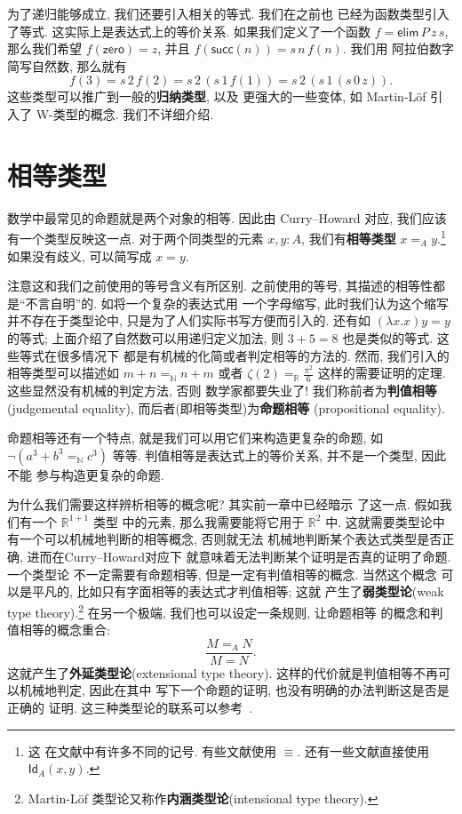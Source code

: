 \documentclass[UTF8]{ctexbook}
\newcommand{\cons}[1]{\textsf{#1}}
\theoremstyle{plain}
\theoremstyle{definition}
\theoremstyle{remark}
\begin{document}
为了递归能够成立, 我们还要引入相关的等式. 我们在之前也
已经为函数类型引入了等式. 这实际上是表达式上的等价关系.
如果我们定义了一个函数 \(f = \cons{elim}\,P\,z\,s\),
那么我们希望 \(f(\cons{zero}) = z\), 并且
\(f(\cons{succ}(n)) = s\,n\,f(n)\). 我们用
阿拉伯数字简写自然数, 那么就有
\[f(3) = s\,2\,f(2) = s\,2\,(s\,1\,f(1)) = s\,2\,(s\,1\,(s\,0\,z)).\]
这些类型可以推广到一般的\textbf{归纳类型}, 以及
更强大的一些变体, 如 Martin-L\"of 引入了 W-类型的概念.
我们不详细介绍.

\section{相等类型}
数学中最常见的命题就是两个对象的相等. 因此由 Curry--Howard
对应, 我们应该有一个类型反映这一点. 对于两个同类型的元素
\(x,y : A\), 我们有\textbf{相等类型} \(x =_A y\).\footnote{这
在文献中有许多不同的记号. 有些文献使用 \(\equiv\).
还有一些文献直接使用 \(\cons{Id}_A(x,y)\).}
如果没有歧义, 可以简写成 \(x = y\).

注意这和我们之前使用的等号含义有所区别. 之前使用的等号,
其描述的相等性都是“不言自明”的. 如将一个复杂的表达式用
一个字母缩写, 此时我们认为这个缩写并不存在于类型论中,
只是为了人们实际书写方便而引入的. 还有如 \((\lambda x.x)y = y\)
的等式; 上面介绍了自然数可以用递归定义加法, 则
\(3 + 5 = 8\) 也是类似的等式. 这些等式在很多情况下
都是有机械的化简或者判定相等的方法的. 然而, 我们引入的
相等类型可以描述如 \(m + n =_{\mathbb N} n + m\) 或者 \(\zeta(2) =_{\mathbb R} \frac{\pi^2}{6}\)
这样的需要证明的定理. 这些显然没有机械的判定方法, 否则
数学家都要失业了!
我们称前者为\textbf{判值相等} (judgemental equality),
而后者(即相等类型)为\textbf{命题相等} (propositional equality).

命题相等还有一个特点, 就是我们可以用它们来构造更复杂的命题,
如 \(\neg (a^3 + b^3 =_{\mathbb N} c^3)\) 等等.
判值相等是表达式上的等价关系, 并不是一个类型, 因此不能
参与构造更复杂的命题.

为什么我们需要这样辨析相等的概念呢? 其实前一章中已经暗示
了这一点. 假如我们有一个 \(\mathbb R^{1+1}\) 类型
中的元素, 那么我需要能将它用于 \(\mathbb R^2\) 中.
这就需要类型论中有一个可以机械地判断的相等概念, 否则就无法
机械地判断某个表达式类型是否正确, 进而在Curry--Howard对应下
就意味着无法判断某个证明是否真的证明了命题. 一个类型论
不一定需要有命题相等, 但是一定有判值相等的概念. 当然这个概念
可以是平凡的, 比如只有字面相等的表达式才判值相等; 这就
产生了\textbf{弱类型论}(weak type theory).\footnote{Martin-L\"of
类型论又称作\textbf{内涵类型论}(intensional
type theory).} 在另一个极端, 我们也可以设定一条规则, 让命题相等
的概念和判值相等的概念重合:
\[\frac{M =_A N}{M = N}.\]
这就产生了\textbf{外延类型论}(extensional type theory).
这样的代价就是判值相等不再可以机械地判定, 因此在其中
写下一个命题的证明, 也没有明确的办法判断这是否是正确的
证明. 这三种类型论的联系可以参考~\cite{winterhalter:2018:ettwtt}.
\end{document}
